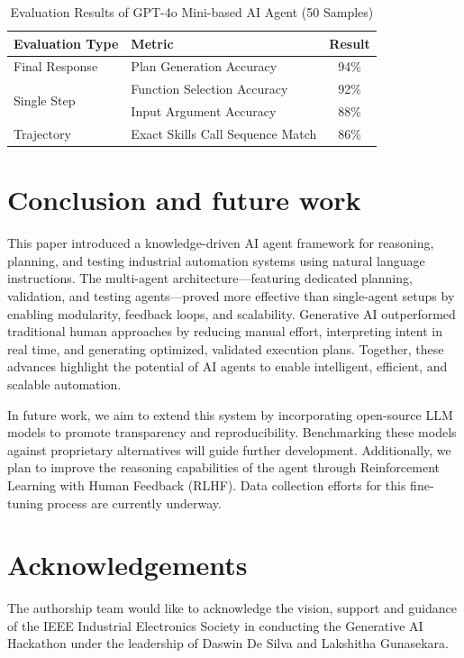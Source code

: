 \begin{bibunit}
    
    \begin{table}[ht]
    \centering
    \caption{Evaluation Results of GPT-4o Mini-based AI Agent (50 Samples)}
    \begin{tabular}{|l|l|c|}
    \hline
    \textbf{Evaluation Type} & \textbf{Metric} & \textbf{Result} \\
    \hline
    \multirow{1}{*}{Final Response} 
        &  Plan Generation Accuracy & 94\%  \\
    \hline
    \multirow{2}{*}{Single Step} 
        & Function Selection Accuracy & 92\% \\
        & Input Argument Accuracy & 88\% \\
    \hline
    \multirow{1}{*}{Trajectory} 
        & Exact Skills Call Sequence Match & 86\% \\
    
    \hline
    \end{tabular}
    \label{tab:evaluation_results}
    \end{table}
    
    
    
    \section{Conclusion and future work}
    \label{sec:conclusion}
    
    This paper introduced a knowledge-driven AI agent framework for reasoning, planning, and testing industrial automation systems using natural language instructions. The multi-agent architecture—featuring dedicated planning, validation, and testing agents—proved more effective than single-agent setups by enabling modularity, feedback loops, and scalability. Generative AI outperformed traditional human approaches by reducing manual effort, interpreting intent in real time, and generating optimized, validated execution plans. Together, these advances highlight the potential of AI agents to enable intelligent, efficient, and scalable automation.
    
    
    In future work, we aim to extend this system by incorporating open-source LLM models to promote transparency and reproducibility. Benchmarking these models against proprietary alternatives will guide further development. Additionally, we plan to improve the reasoning capabilities of the agent through Reinforcement Learning with Human Feedback (RLHF). Data collection efforts for this fine-tuning process are currently underway.
    
    \section{Acknowledgements}
    The authorship team would like to acknowledge the vision, support and guidance of the IEEE Industrial Electronics Society in conducting the Generative AI Hackathon under the leadership of Daswin De Silva and Lakshitha Gunasekara.
    
\clearpage
\putbib
\end{bibunit} 